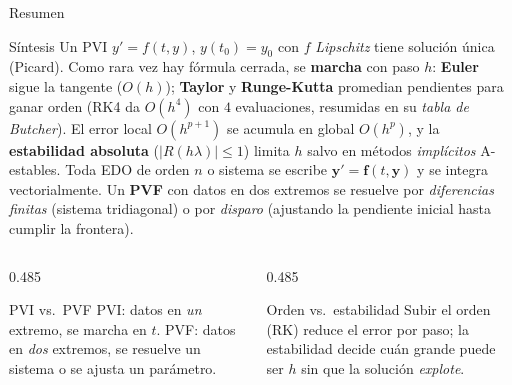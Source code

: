 \documentclass[aspectratio=169,10pt]{beamer}
\begin{document}
\begin{frame}{Resumen}
\begin{cardidea}{Síntesis}{\faLightbulb}
Un PVI $y'=f(t,y)$, $y(t_0)=y_0$ con $f$ \emph{Lipschitz} tiene solución única (Picard). Como rara vez hay fórmula cerrada, se \textbf{marcha} con paso $h$: \textbf{Euler} sigue la tangente ($O(h)$); \textbf{Taylor} y \textbf{Runge-Kutta} promedian pendientes para ganar orden (RK4 da $O(h^4)$ con $4$ evaluaciones, resumidas en su \emph{tabla de Butcher}). El error local $O(h^{p+1})$ se acumula en global $O(h^p)$, y la \textbf{estabilidad absoluta} ($|R(h\lambda)|\le1$) limita $h$ salvo en métodos \emph{implícitos} A-estables. Toda EDO de orden $n$ o sistema se escribe $\mathbf y'=\mathbf f(t,\mathbf y)$ y se integra vectorialmente. Un \textbf{PVF} con datos en dos extremos se resuelve por \emph{diferencias finitas} (sistema tridiagonal) o por \emph{disparo} (ajustando la pendiente inicial hasta cumplir la frontera).
\end{cardidea}
\vspace{2mm}
\begin{columns}[T]
\begin{column}{0.485\textwidth}
\begin{cardgear}{PVI vs.\ PVF}{\faCogs}
PVI: datos en \emph{un} extremo, se marcha en $t$. PVF: datos en \emph{dos} extremos, se resuelve un sistema o se ajusta un parámetro.
\end{cardgear}
\end{column}
\begin{column}{0.485\textwidth}
\begin{cardgear}{Orden vs.\ estabilidad}{\faCogs}
Subir el orden (RK) reduce el error por paso; la estabilidad decide cuán grande puede ser $h$ sin que la solución \emph{explote}.
\end{cardgear}
\end{column}
\end{columns}
\end{frame}
\end{document}
